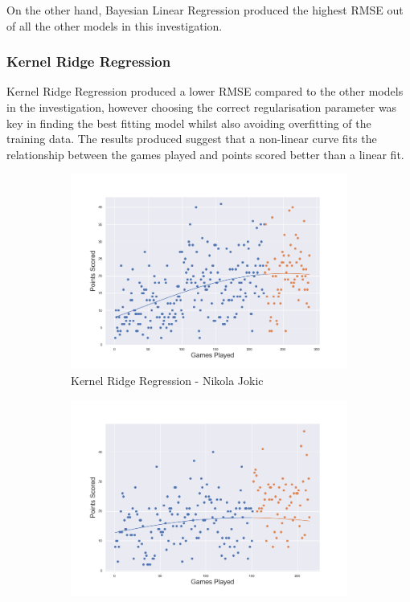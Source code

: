 \documentclass[a4paper,11pt,twoside]{article}
\begin{document}
On the other hand, Bayesian Linear Regression produced the highest RMSE out of all the other models in this investigation.

\subsubsection{Kernel Ridge Regression}

Kernel Ridge Regression produced a lower RMSE compared to the other models in the investigation, however choosing the correct regularisation parameter was key in finding the best fitting model whilst also avoiding overfitting of the training data. The results produced suggest that a non-linear curve fits the relationship between the games played and points scored better than a linear fit.


\begin{figure} [h!]
\centering
  \begin{subfigure}[b]{0.75\textwidth}
    \includegraphics[width=\textwidth]{../players_krr/player24.png}
    \caption{Kernel Ridge Regression - Nikola Jokic}
    \label{fig:1}
  \end{subfigure}
  \begin{subfigure}[b]{0.75\textwidth}
    \includegraphics[width=\textwidth]{../players_krr/player11.png}

\end{subfigure}
\end{figure}
\end{document}
